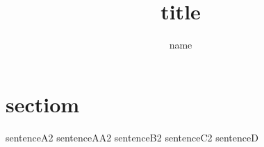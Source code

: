 \documentclass{jarticle}
\title{title}
\author{name}
\begin{document}
\maketitle
\section{sectiom}
sentenceA2
sentenceAA2
sentenceB2
sentenceC2
sentenceD
\end{document}
